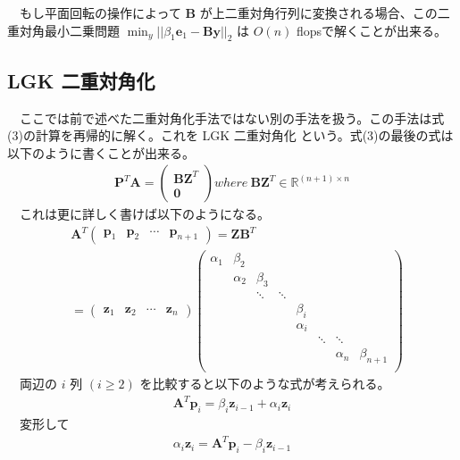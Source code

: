 \documentclass[a4paper,10pt]{jarticle}
\begin{document}
　もし平面回転の操作によって \(\bm{B}\) が上二重対角行列に変換される場合、この二重対角最小二乗問題 \(\min_y||\beta_1\bm{e}_1 - \bm{B}\bm{y}||_2\) は \(O(n)\) flopsで解くことが出来る。\\
\subsection{LGK 二重対角化}
\label{sec:org3581da6}
　ここでは前で述べた二重対角化手法ではない別の手法を扱う。この手法は式(3)の計算を再帰的に解く。これを LGK 二重対角化 という。式(3)の最後の式は以下のように書くことが出来る。\\
\begin{align*}
\bm{P}^T\bm{A}=
\begin{pmatrix}
\bm{B}\bm{Z}^T\\
\bm{0}
\end{pmatrix}  where \ \bm{B}\bm{Z}^T \in \mathbb{R}^{(n+1)\times n}
\end{align*}
　これは更に詳しく書けば以下のようになる。\\
\begin{align*}
&\bm{A}^T
\begin{pmatrix}
\bm{p}_1& \bm{p}_2&\cdots & \bm{p}_{n+1}
\end{pmatrix}
= \bm{Z} \bm{B}^T  \\
&= 
\begin{pmatrix}
\bm{z}_1 & \bm{z}_2 &\cdots &\bm{z}_n
\end{pmatrix}
\begin{pmatrix}
\alpha_1& \beta_2& & & & &&\\
&\alpha_2& \beta_3&  & &&&\\
&&\ddots& \ddots &   &&&\\
&&&& \beta_i &&\\
&&&& \alpha_i && \\
&&&&&\ddots & \ddots & \\ 
&&&&&& \alpha_n & \beta_{n+1}   \\
\end{pmatrix}
\end{align*}
　両辺の \(i\) 列 \((i\geq 2)\) を比較すると以下のような式が考えられる。\\
\begin{align*}
\bm{A}^T\bm{p}_i = \beta_i\bm{z}_{i-1} + \alpha_i \bm{z}_i
\end{align*}
　変形して\\
\begin{align*}
\alpha_i\bm{z}_i=\bm{A}^T\bm{p}_i - \beta_i\bm{z}_{i-1} \tag{5}
\end{align*}
\end{document}
